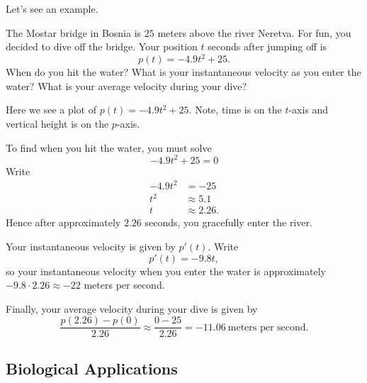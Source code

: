 Let's see an example.

\begin{example}
The Mostar bridge in Bosnia is $25$ meters above the river
Neretva. For fun, you decided to dive off the bridge. Your position
$t$ seconds after jumping off is
\[
p(t) = -4.9t^2 + 25.
\]
When do you hit the water? What is your instantaneous velocity as you
enter the water?  What is your average velocity during your dive?
\end{example}
\begin{marginfigure}
\caption{Here we see a plot of $p(t) = -4.9t^2 + 25$. Note, time is on
  the $t$-axis and vertical height is on the $p$-axis.}
\end{marginfigure}
\begin{solution}
To find when you hit the water, you must solve
\[
-4.9t^2 + 25 = 0
\]
Write
\begin{align*}
-4.9t^2 &= -25 \\
t^2 &\approx 5.1 \\ 
t &\approx 2.26.
\end{align*}
Hence after approximately $2.26$ seconds, you gracefully enter the
river.

Your instantaneous velocity is given by $p'(t)$. Write
\[
p'(t) = -9.8t,
\]
so your instantaneous velocity when you enter the water is
approximately $-9.8\cdot 2.26\approx -22$ meters per second.

Finally, your average velocity during your dive is given by
\[
\frac{p(2.26) -p(0)}{2.26} \approx \frac{0-25}{2.26} =
-11.06~\text{meters per second}.
\]
\end{solution}





\subsection*{Biological Applications}

